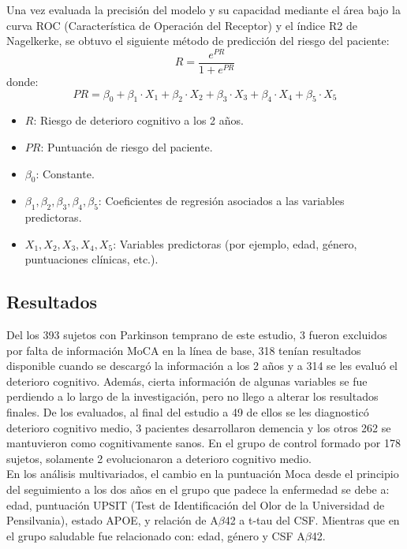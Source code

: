 \begin{description}
		Una vez evaluada la precisión del modelo y su capacidad mediante el área bajo la curva ROC (Característica de Operación del Receptor) y el índice R2 de Nagelkerke, se obtuvo el siguiente método de predicción del riesgo del paciente:\\
		
		\begin{equation}
			R = \frac{e^{PR}}{1 + e^{PR}}
		\end{equation}
		donde:
		\begin{equation}
			PR = \beta_0 + \beta_1 \cdot X_1 + \beta_2 \cdot X_2 + \beta_3 \cdot X_3 + \beta_4 \cdot X_4 + \beta_5 \cdot X_5
		\end{equation}
		
		\begin{itemize}
			\item $R$: Riesgo de deterioro cognitivo a los 2 años.
			\item $PR$: Puntuación de riesgo del paciente.
			\item $\beta_0$: Constante.
			\item $\beta_1, \beta_2, \beta_3, \beta_4, \beta_5$: Coeficientes de regresión asociados a las variables predictoras.
			\item $X_1, X_2, X_3, X_4, X_5$: Variables predictoras (por ejemplo, edad, género, puntuaciones clínicas, etc.).
		\end{itemize}
		
	\end{description}
	
	\subsection{Resultados}
	
	Del los 393 sujetos con Parkinson temprano de este estudio, 3 fueron excluidos por falta de información MoCA en la línea de base, 318 tenían resultados disponible cuando se descargó la información a los 2 años y a 314 se les evaluó el deterioro cognitivo. Además, cierta información de algunas variables se fue perdiendo a lo largo de la investigación, pero no llego a alterar los resultados finales. De los evaluados, al final del estudio a 49 de ellos se les diagnosticó deterioro cognitivo medio, 3 pacientes desarrollaron demencia y los otros 262 se mantuvieron como cognitivamente sanos. En el grupo de control formado por 178 sujetos, solamente 2 evolucionaron a deterioro cognitivo medio.\\
	
	En los análisis multivariados, el cambio en la puntuación Moca desde el principio del seguimiento a los dos años en el grupo que padece la enfermedad se debe a: edad, puntuación UPSIT (Test de Identificación del Olor de la Universidad de Pensilvania), 
	estado APOE, y relación de A$\beta$42 a t-tau del CSF. Mientras que en el grupo saludable fue relacionado con: edad, género y CSF A$\beta$42.\\
	
